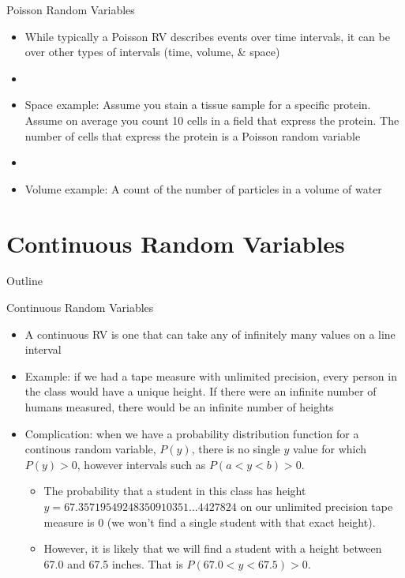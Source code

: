 \documentclass[xcolor=dvipsnames]{beamer}
\begin{document}
\begin{frame}{Poisson Random Variables}
	\begin{itemize}
		\item While typically a Poisson RV describes events over time intervals, it can be over other types of intervals (time, volume, \& space)
		\item[]
		\item Space example: Assume you stain a tissue sample for a specific protein. Assume on average you count 10 cells in a field that express the protein. The number of cells that express the protein is a Poisson random variable 
		\item[]
		\item Volume example: A count of the number of particles in a volume of water
	\end{itemize}
\end{frame}

\section{Continuous Random Variables}
\begin{frame}{Outline}
	\tableofcontents[currentsection,subsectionstyle=show/shaded/hide]
\end{frame}

\begin{frame}{Continuous Random Variables}
	\begin{itemize}
	\item A continuous RV is one that can take any of infinitely many values on a line interval
	\item Example: if we had a tape measure with unlimited precision, every person in the class would have a unique height. If there were an infinite number of humans measured, there would be an infinite number of heights
	
	\item Complication: when we have a probability distribution function for a continous random variable, $P(y)$, there is no single $y$ value for which $P(y) > 0$,
	however intervals such as $P(a<y<b) > 0$. 
	\begin{itemize}
		\item The probability that a student in this class has height $y = 67.35719549248350910351...4427824$ on our unlimited precision tape measure is 0 (we won't find a single student with that exact height). 
		\item However, it is likely that we will find a student with a height between 67.0 and 67.5 inches. That is $P(67.0 < y < 67.5) > 0$. 
	\end{itemize}
\end{itemize}
\end{frame}
\end{document}
